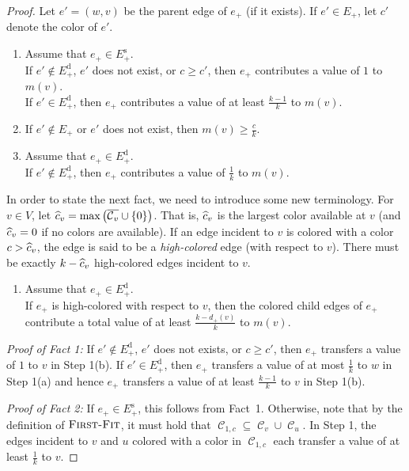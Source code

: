 \documentclass[smallextended]{svjour3}
\newcommand{\colorset}{\ensuremath{\operatorname{\mathcal{C}}}\xspace}
\newcommand{\ec}{\ensuremath{E_{+}}\xspace}
\newcommand{\ed}{\ensuremath{E_{+}^{\text{d}}}\xspace}
\newcommand{\es}{\ensuremath{E_{+}^{\text{s}}}\xspace}
\def\dc{d_{+}}
\newcommand{\FF}{\ensuremath{\operatorname{\textsc{First-Fit}}}\xspace}
\begin{document}
\begin{proof}
Let $e'=(w,v)$ be the parent edge of $e_+$ (if it exists). 
If $e' \in E_+$, let $c'$ denote the color of $e'$.

\begin{enumerate}[Fact 1:]
\item[Fact 1:]
{Assume that $e_+ \in \es$. \\
 If $e'\notin \ed$, $e'$ does not exist, or $c \geq c'$, then $e_+$ contributes
  a value of $1$ to $m(v)$.\\ 
 If $e'\in \ed$, then $e_+$ contributes a value of at least
  $\frac{k-1}{k}$ to $m(v)$.
 }
\item[Fact 2:]
{If $e' \not\in\ec$ or $e'$ does not exist, then $m(v)\geq
  \frac{c}{k}$. 
 } 
\item[Fact 3:]
{Assume that $e_+\in\ed$.\\
 If $e'\notin \ed$, then $e_+$ contributes a value of $\frac1k$ to
  $m(v)$.
 }
\end{enumerate}

In order to state the next fact, we need to introduce some new
terminology. For $v\in V$, let $\cmisv
=\max\left(\overline{\colorset_v}\cup\{0\}\right)$. That is, $\widehat{c}_v$ is the
largest color available at $v$ (and $\widehat{c}_v=0$ if no colors are
available). If an edge incident to $v$ is colored with a
color $c > \widehat{c}_v$, the edge is said to be a \emph{high-colored} edge (with respect to $v$). There must be exactly $k-\widehat{c}_v$ high-colored edges incident to $v$.

\begin{enumerate}[Fact 4:]
\item[Fact 4:]
{Assume that $e_+\in \ed$.\\
 If $e_+$ is high-colored with respect to $v$, then the colored child
  edges of $e_+$ contribute a total value of at least
  $\frac{k-\dc(v)}{k}$ to $m(v)$.
 }
\end{enumerate}

{\em Proof of Fact 1:}
If $e'\notin \ed$, $e'$ does not exists, or $c \geq c'$, then $e_+$ transfers a value of $1$ to $v$ in Step 1(b). If $e'\in\ed$, then $e_+$ transfers a value of at most $\frac1k$ to $w$ in Step 1(a) and hence $e_+$ transfers a value of at least $\frac{k-1}{k}$ to $v$ in Step 1(b).

{\em 
Proof of Fact 2:}
If $e_+\in \es$, this follows from Fact~1. Otherwise, note that by the definition of \FF, it must hold that $\colorset_{1,c}\subseteq \colorset_v\cup \colorset_u$. In Step 1, the edges incident to $v$ and $u$ colored with a color in $\colorset_{1,c}$ each transfer a value of at least $\frac1k$ to $v$.


\end{proof}
\end{document}
